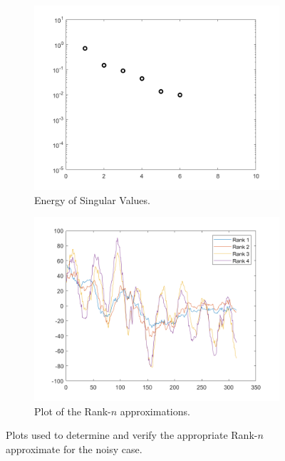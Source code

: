 \documentclass[12pt]{article}%
\begin{document}
\begin{figure}
    \begin{subfigure}[b]{0.5\linewidth}
      \centering
      \includegraphics[width=\linewidth]{2-energy.png}
      \caption{Energy of Singular Values.}
      \label{fig2:a}
      \vspace{4ex}
    \end{subfigure}%
    \begin{subfigure}[b]{0.5\linewidth}
      \centering
      \includegraphics[width=\linewidth]{2-aprox.png}
      \caption{Plot of the Rank-$n$ approximations.}
      \label{fig2:b}
      \vspace{4ex}
    \end{subfigure}
    \caption{Plots used to determine and verify the appropriate Rank-$n$ approximate for the noisy case.}
    \label{fig2}
\end{figure}
\end{document}
